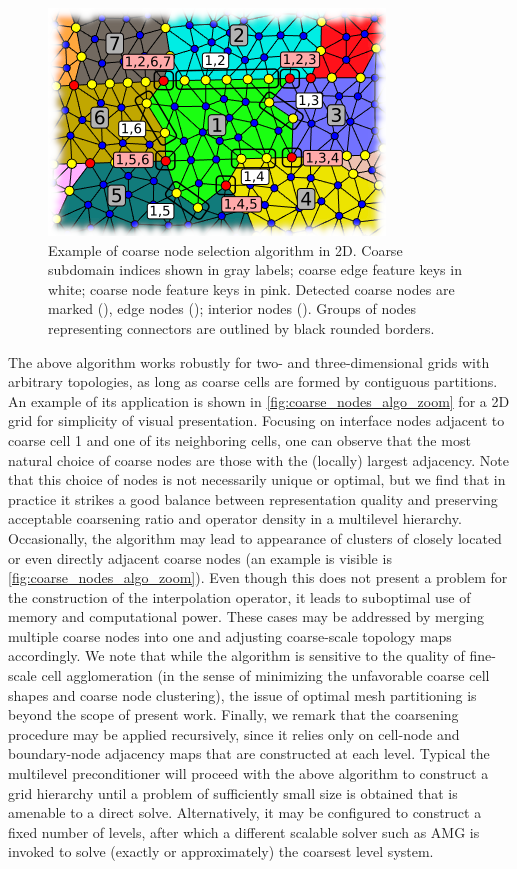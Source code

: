 \begin{figure}[htbp]
  \centerline{\includegraphics[width=0.5\linewidth]{figs/coarsening_2d_zoom_labels.png}}
  \caption[Coarse node selection algorithm example in 2D]{\label{fig:coarse_nodes_algo_zoom} Example of coarse node selection algorithm in 2D. Coarse subdomain indices shown in gray labels; coarse edge feature keys in white; coarse node feature keys in pink. Detected coarse nodes are marked (), edge nodes (); interior nodes (). Groups of nodes representing connectors are outlined by black rounded borders.}
\end{figure}

The above algorithm works robustly for two- and three-dimensional grids with arbitrary topologies, as long as coarse cells are formed by contiguous partitions.   An example of its application is shown in \autoref{fig:coarse_nodes_algo_zoom} for a 2D grid for simplicity of visual presentation.   Focusing on interface nodes adjacent to coarse cell 1 and one of its neighboring cells, one can observe that the most natural choice of coarse nodes are those with the (locally) largest adjacency.   Note that this choice of nodes is not necessarily unique or optimal, but we find that in practice it strikes a good balance between representation quality and preserving acceptable coarsening ratio and operator density in a multilevel hierarchy.   Occasionally, the algorithm may lead to appearance of clusters of closely located or even directly adjacent coarse nodes (an example is visible is \autoref{fig:coarse_nodes_algo_zoom}). Even though this does not present a problem for the construction of the interpolation operator, it leads to suboptimal use of memory and computational power.   These cases may be addressed by merging multiple coarse nodes into one and adjusting coarse-scale topology maps accordingly.   We note that while the algorithm is sensitive to the quality of fine-scale cell agglomeration (in the sense of minimizing the unfavorable coarse cell shapes and coarse node clustering), the issue of optimal mesh partitioning is beyond the scope of present work.   Finally, we remark that the coarsening procedure may be applied recursively, since it relies only on cell-node and boundary-node adjacency maps that are constructed at each level.   Typical the multilevel preconditioner will proceed with the above algorithm to construct a grid hierarchy until a problem of sufficiently small size is obtained that is amenable to a direct solve.   Alternatively, it may be configured to construct a fixed number of levels, after which a different scalable solver such as AMG is invoked to solve (exactly or approximately) the coarsest level system.


